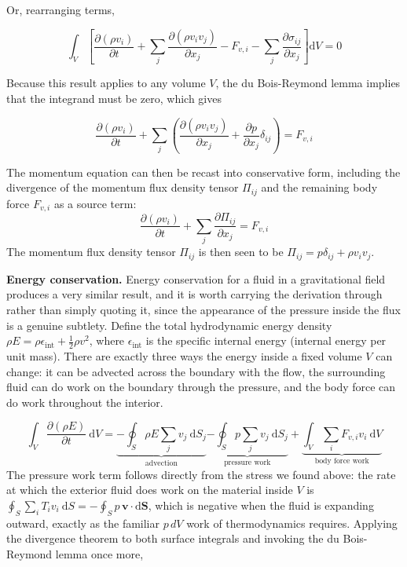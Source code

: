 \documentclass[notoc]{tufte-handout}
\renewcommand{\vec}[1]{\mathbf{#1}}
\begin{document}
Or, rearranging terms,

\begin{equation}
\int_V \left[ \frac{\partial(\rho {v}_i)}{\partial t} + \sum_j \frac{\partial(\rho {v}_iv_j)}{\partial x_j} - F_{v,i} - \sum_j \frac{\partial \sigma_{ij}}{\partial x_j} \right]\mathrm{d}V    = 0
\end{equation}

Because this result applies to any volume $V$, the du Bois-Reymond lemma implies that the integrand must be zero, which gives

\begin{equation}
\frac{\partial(\rho {v}_i)}{\partial t} + \sum_j \left (  \frac{\partial(\rho {v}_i {v}_j)}{\partial x_j} + \frac{\partial p}{\partial x_j} \delta_{ij} \right) = F_{v,i}
\end{equation}

The momentum equation can then be recast into conservative form, including the divergence of the momentum flux density tensor $\Pi_{ij}$ and the remaining body force $F_{v,i}$ as a source term:
\begin{equation}
\boxed {\frac{\partial(\rho {v}_i)}{\partial t} + \sum_j \frac{\partial \Pi_{ij}} {\partial x_j} = F_{v,i} }
\label{eqn:momentum_equation}
\end{equation}
%
The momentum flux density tensor $\Pi_{ij}$ is then seen to be $\Pi_{ij} = p \delta_{ij} + \rho v_i v_j$.

{\bf Energy conservation.}
Energy conservation for a fluid in a gravitational field produces a very similar result, and it is worth carrying the derivation through rather than simply quoting it, since the appearance of the pressure inside the flux is a genuine subtlety. Define the total hydrodynamic energy density $\rho E = \rho \epsilon_{\text{int}} + \frac{1}{2}\rho v^2$, where $\epsilon_{\text{int}}$ is the specific internal energy (internal energy per unit mass). There are exactly three ways the energy inside a fixed volume $V$ can change: it can be advected across the boundary with the flow, the surrounding fluid can do work on the boundary through the pressure, and the body force can do work throughout the interior.

\begin{equation}
\int_V \frac{\partial (\rho E)}{\partial t}~\mathrm{d}V = \underbrace{- \oint_S \rho E \sum_j v_j ~\mathrm{d}S_j}_{\text{advection}} \underbrace{- \oint_S p \sum_j v_j ~\mathrm{d}S_j}_{\text{pressure work}} + \underbrace{\int_V \sum_i F_{v,i} v_i ~\mathrm{d}V}_{\text{body force work}}
\end{equation}
%
The pressure work term follows directly from the stress we found above: the rate at which the exterior fluid does work on the material inside $V$ is $\oint_S \sum_i T_i v_i ~\mathrm{d}S = -\oint_S p \, \vec{v} \cdot \mathrm{d}\vec{S}$, which is negative when the fluid is expanding outward, exactly as the familiar $p \, dV$ work of thermodynamics requires. Applying the divergence theorem to both surface integrals and invoking the du Bois-Reymond lemma once more,
\end{document}
